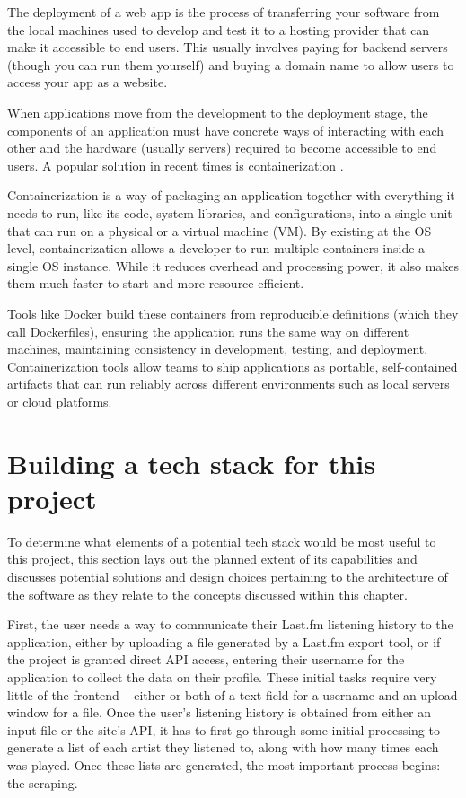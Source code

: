 The deployment of a web app is the process of transferring your software from the local machines used to develop and test it to a hosting provider that can make it accessible to end users. This usually involves paying for backend servers (though you can run them yourself) and buying a domain name to allow users to access your app as a website.

When applications move from the development to the deployment stage, the components of an application must have concrete ways of interacting with each other and the hardware (usually servers) required to become accessible to end users. A popular solution in recent times is containerization \cite{adedeji_full-stack_2023}.

Containerization is a way of packaging an application together with everything it needs to run, like its code, system libraries, and configurations, into a single unit that can run on a physical or a virtual machine (VM). By existing at the OS level, containerization allows a developer to run multiple containers inside a single OS instance. While it reduces overhead and processing power, it also makes them much faster to start and more resource-efficient.

Tools like Docker build these containers from reproducible definitions (which they call Dockerfiles), ensuring the application runs the same way on different machines, maintaining consistency in development, testing, and deployment. Containerization tools allow teams to ship applications as portable, self-contained artifacts that can run reliably across different environments such as local servers or cloud platforms.

\section{Building a tech stack for this project}

To determine what elements of a potential tech stack would be most useful to this project, this section lays out the planned extent of its capabilities and discusses potential solutions and design choices pertaining to the architecture of the software as they relate to the concepts discussed within this chapter.

First, the user needs a way to communicate their Last.fm listening history to the application, either by uploading a file generated by a Last.fm export tool, or if the project is granted direct API access, entering their username for the application to collect the data on their profile. These initial tasks require very little of the frontend -- either or both of a text field for a username and an upload window for a file. Once the user's listening history is obtained from either an input file or the site's API, it has to first go through some initial processing to generate a list of each artist they listened to, along with how many times each was played. Once these lists are generated, the most important process begins: the scraping.

